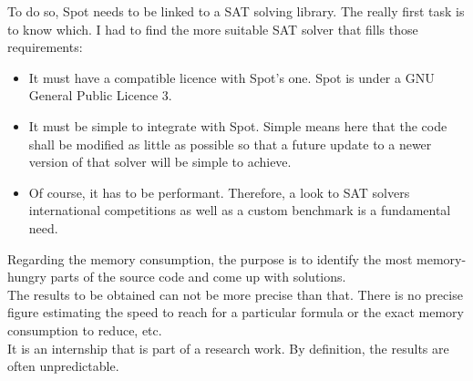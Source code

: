 To do so, Spot needs to be linked to a SAT solving library. The really first task is to know which. I had
to find the more suitable SAT solver that fills those requirements:
\begin{itemize}
 \item It must have a compatible licence with Spot's one. Spot is under a GNU General Public Licence 3.
 \item It must be simple to integrate with Spot. Simple means here that the code shall be modified as little
       as possible so that a future update to a newer version of that solver will be simple to achieve.
 \item Of course, it has to be performant. Therefore, a look to SAT solvers international competitions as
       well as a custom benchmark is a fundamental need.
\end{itemize}

\noindent Regarding the memory consumption, the purpose is to identify the most memory-hungry parts of the
source code and come up with solutions.\\

The results to be obtained can not be more precise than that. There is no precise figure estimating the
speed to reach for a particular formula or the exact memory consumption to reduce, etc.\\

It is an internship that is part of a research work. By definition, the results are often unpredictable.